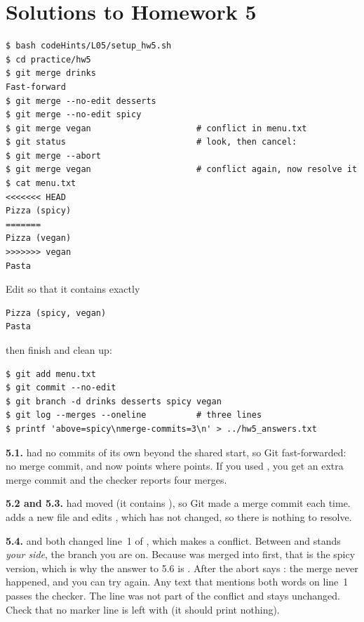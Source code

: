 \section*{Solutions to Homework 5}

\begin{lstlisting}
$ bash codeHints/L05/setup_hw5.sh
$ cd practice/hw5
$ git merge drinks
Fast-forward
$ git merge --no-edit desserts
$ git merge --no-edit spicy
$ git merge vegan                     # conflict in menu.txt
$ git status                          # look, then cancel:
$ git merge --abort
$ git merge vegan                     # conflict again, now resolve it
$ cat menu.txt
<<<<<<< HEAD
Pizza (spicy)
=======
Pizza (vegan)
>>>>>>> vegan
Pasta
\end{lstlisting}

Edit  so that it contains exactly

\begin{lstlisting}
Pizza (spicy, vegan)
Pasta
\end{lstlisting}

then finish and clean up:

\begin{lstlisting}
$ git add menu.txt
$ git commit --no-edit
$ git branch -d drinks desserts spicy vegan
$ git log --merges --oneline          # three lines
$ printf 'above=spicy\nmerge-commits=3\n' > ../hw5_answers.txt
\end{lstlisting}

\textbf{5.1.}  had no commits of its own beyond the shared start, so Git fast-forwarded: no merge commit, and  now points where  points. If you used , you get an extra merge commit and the checker reports four merges.

\textbf{5.2 and 5.3.}  had moved (it contains ), so Git made a merge commit each time.  adds a new file and  edits , which  has not changed, so there is nothing to resolve.

\textbf{5.4.}  and  both changed line~1 of , which makes a conflict. Between  and \code{=======} stands \emph{your side}, the branch you are on. Because  was merged into  first, that is the spicy version, which is why the answer to 5.6 is . After the abort  says : the merge never happened, and you can try again. Any text that mentions both words on line~1 passes the checker. The line  was not part of the conflict and stays unchanged. Check that no marker line is left with  (it should print nothing).

